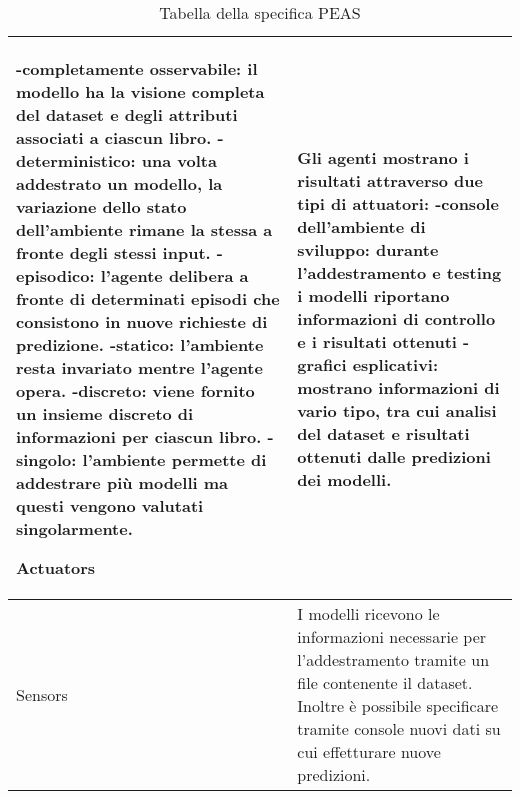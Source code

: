 \documentclass[12pt,oneside]{article}
\begin{document}
\begin{table}[ht]
\begin{tabular}{ | p{3cm} | p{9cm} | }
    -completamente osservabile: il modello ha la visione completa del dataset e degli attributi associati a ciascun libro.
    -deterministico: una volta addestrato un modello, la variazione dello stato dell'ambiente rimane la stessa a fronte degli stessi input.
    -episodico: l'agente delibera a fronte di determinati episodi che consistono in nuove richieste di predizione.
    -statico: l'ambiente resta invariato mentre l'agente opera.
    -discreto: viene fornito un insieme discreto di informazioni per ciascun libro.
    -singolo: l'ambiente permette di addestrare più modelli ma questi vengono valutati singolarmente.
    
    \hline
    Actuators& Gli agenti mostrano i risultati attraverso due tipi di attuatori:  %
    -console dell'ambiente di sviluppo: durante l'addestramento e testing i modelli riportano informazioni di controllo e i risultati ottenuti
    -grafici esplicativi: mostrano informazioni di vario tipo, tra cui analisi del dataset e risultati ottenuti dalle predizioni dei modelli.\\
    \hline
    Sensors& I modelli ricevono le informazioni necessarie per l'addestramento tramite un file contenente il dataset. Inoltre è possibile specificare tramite console nuovi dati su cui effetturare nuove predizioni. \\
    \hline
    \end{tabular}

\caption{Tabella della specifica PEAS}
\label{table:ta}

\end{table}

    
\end{document}
